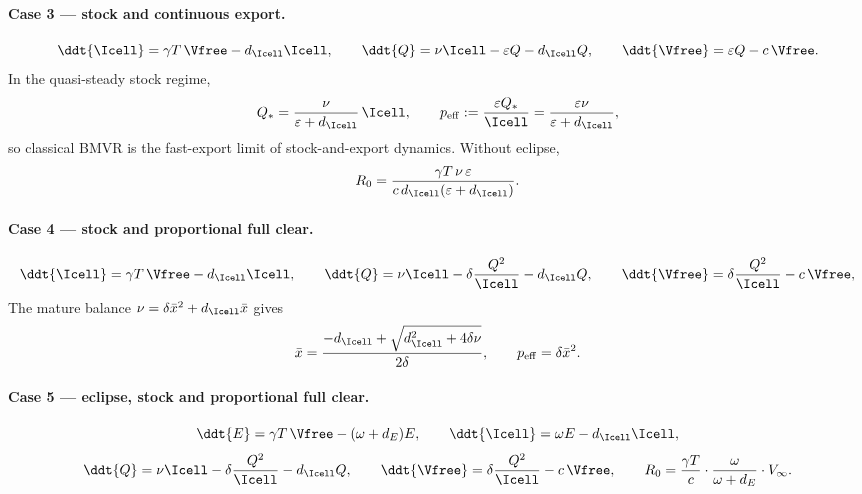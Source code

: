 \paragraph{Case 3 --- stock and continuous export.}
\begin{equation}
\ddt{\Icell}=\gamma T\,\Vfree-d_{\Icell}\Icell,
\qquad
\ddt{Q}=\nu\Icell-\varepsilon Q-d_{\Icell}Q,
\qquad
\ddt{\Vfree}=\varepsilon Q-c\,\Vfree.
\label{p:eq:case3}
\end{equation}
In the quasi-steady stock regime,
\begin{equation}
Q_*=\frac{\nu}{\varepsilon+d_{\Icell}}\,\Icell,
\qquad
p_{\mathrm{eff}}:=\frac{\varepsilon Q_*}{\Icell}
=\frac{\varepsilon\nu}{\varepsilon+d_{\Icell}},
\label{p:eq:case3qss}
\end{equation}
so classical BMVR is the fast-export limit of stock-and-export dynamics.
Without eclipse,
\begin{equation}
R_0=\frac{\gamma T\,\nu\,\varepsilon}{c\,d_{\Icell}(\varepsilon+d_{\Icell})}.
\label{p:eq:case3R0}
\end{equation}

\paragraph{Case 4 --- stock and proportional full clear.}
\begin{equation}
\ddt{\Icell}=\gamma T\,\Vfree-d_{\Icell}\Icell,
\qquad
\ddt{Q}=\nu\Icell-\delta\frac{Q^2}{\Icell}-d_{\Icell}Q,
\qquad
\ddt{\Vfree}=\delta\frac{Q^2}{\Icell}-c\,\Vfree,
\label{p:eq:case4}
\end{equation}
The mature balance $\nu=\delta\bar x^2+d_{\Icell}\bar x$ gives
\begin{equation}
\bar x=\frac{-d_{\Icell}+\sqrt{d_{\Icell}^2+4\delta\nu}}{2\delta},
\qquad
p_{\mathrm{eff}}=\delta\bar x^2.
\label{p:eq:case4qss}
\end{equation}

\paragraph{Case 5 --- eclipse, stock and proportional full clear.}
\begin{equation}
\ddt{E}=\gamma T\,\Vfree-(\omega+d_E)E,
\qquad
\ddt{\Icell}=\omega E-d_{\Icell}\Icell,
\label{p:eq:case5}
\end{equation}
\begin{equation}
\ddt{Q}=\nu\Icell-\delta\frac{Q^2}{\Icell}-d_{\Icell}Q,
\qquad
\ddt{\Vfree}=\delta\frac{Q^2}{\Icell}-c\,\Vfree,
\qquad
R_0=\frac{\gamma T}{c}\cdot\frac{\omega}{\omega+d_E}\cdot V_\infty.
\label{p:eq:case5R0}
\end{equation}

